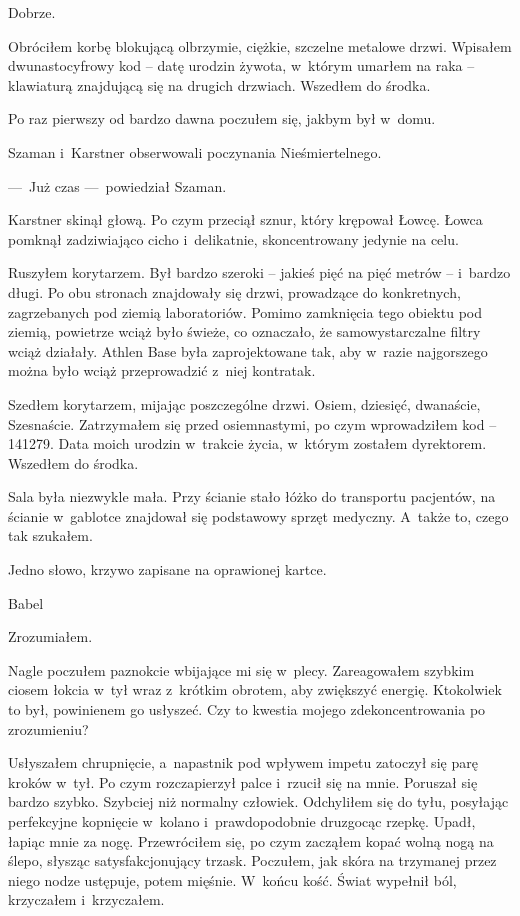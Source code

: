 Dobrze.

Obróciłem korbę blokującą olbrzymie, ciężkie, szczelne metalowe drzwi. Wpisałem dwunastocyfrowy kod -- datę urodzin żywota, w~którym umarłem na raka -- klawiaturą znajdującą się na drugich drzwiach. Wszedłem do środka.

Po raz pierwszy od bardzo dawna poczułem się, jakbym był w~domu.

\paraSep

Szaman i~Karstner obserwowali poczynania Nieśmiertelnego.

---~Już czas ---~powiedział Szaman. 

Karstner skinął głową. Po czym przeciął sznur, który krępował Łowcę. Łowca pomknął zadziwiająco cicho i~delikatnie, skoncentrowany jedynie na celu.

\paraSep

Ruszyłem korytarzem. Był bardzo szeroki -- jakieś pięć na pięć metrów -- i~bardzo długi. Po obu stronach znajdowały się drzwi, prowadzące do konkretnych, zagrzebanych pod ziemią laboratoriów. Pomimo zamknięcia tego obiektu pod ziemią, powietrze wciąż było świeże, co oznaczało, że samowystarczalne filtry wciąż działały. Athlen Base była zaprojektowane tak, aby w~razie najgorszego można było wciąż przeprowadzić z~niej kontratak.

Szedłem korytarzem, mijając poszczególne drzwi. Osiem, dziesięć, dwanaście, Szesnaście. Zatrzymałem się przed osiemnastymi, po czym wprowadziłem kod -- 141279. Data moich urodzin w~trakcie życia, w~którym zostałem dyrektorem. Wszedłem do środka.

Sala była niezwykle mała. Przy ścianie stało łóżko do transportu pacjentów, na ścianie w~gablotce znajdował się podstawowy sprzęt medyczny. A~także to, czego tak szukałem.

Jedno słowo, krzywo zapisane na oprawionej kartce.

\begin{itquote}
Babel
\end{itquote}

Zrozumiałem.

Nagle poczułem paznokcie wbijające mi się w~plecy. Zareagowałem szybkim ciosem łokcia w~tył wraz z~krótkim obrotem, aby zwiększyć energię. Ktokolwiek to był, powinienem go usłyszeć. Czy to kwestia mojego zdekoncentrowania po zrozumieniu? 

Usłyszałem chrupnięcie, a~napastnik pod wpływem impetu zatoczył się parę kroków w~tył. Po czym rozczapierzył palce i~rzucił się na mnie. Poruszał się bardzo szybko. Szybciej niż normalny człowiek. Odchyliłem się do tyłu, posyłając perfekcyjne kopnięcie w~kolano i~prawdopodobnie druzgocąc rzepkę. Upadł, łapiąc mnie za nogę. Przewróciłem się, po czym zacząłem kopać wolną nogą na ślepo, słysząc satysfakcjonujący trzask. Poczułem, jak skóra na trzymanej przez niego nodze ustępuje, potem mięśnie. W~końcu kość. Świat wypełnił ból, krzyczałem i~krzyczałem.

